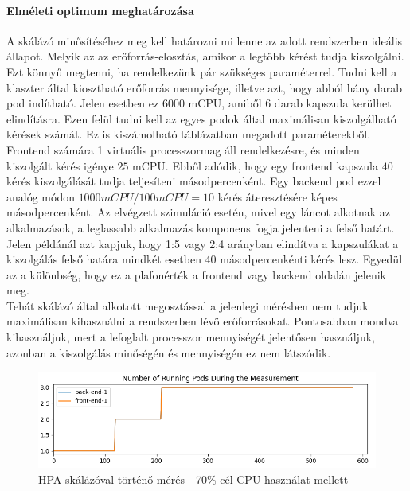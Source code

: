 \paragraph{Elméleti optimum meghatározása} 
A skálázó minősítéséhez meg kell határozni mi lenne az adott rendszerben ideális állapot.
Melyik az az erőforrás-elosztás, amikor a legtöbb kérést tudja kiszolgálni.
Ezt könnyű megtenni, ha rendelkezünk pár szükséges paraméterrel.
Tudni kell a klaszter által kiosztható erőforrás mennyisége, illetve azt, hogy abból hány darab pod indítható. Jelen esetben ez $6000$ mCPU, amiből $6$ darab kapszula kerülhet elindításra.
Ezen felül tudni kell az egyes podok által maximálisan kiszolgálható kérések számát. 
Ez is kiszámolható  táblázatban megadott paraméterekből. 
Frontend számára 1 virtuális processzormag áll rendelkezésre, és minden kiszolgált kérés igénye $25$ mCPU.
Ebből adódik, hogy egy frontend kapszula $40$ kérés kiszolgálását tudja teljesíteni másodpercenként. 
Egy backend pod ezzel analóg módon $1000mCPU / 100mCPU = 10$ kérés áteresztésére képes másodpercenként.
Az elvégzett szimuláció esetén, mivel egy láncot alkotnak az alkalmazások, a leglassabb alkalmazás komponens fogja jelenteni a felső határt.
Jelen példánál azt kapjuk, hogy 1:5 vagy 2:4 arányban elindítva a kapszulákat a kiszolgálás felső határa mindkét esetben $40$ másodpercenkénti kérés lesz.
Egyedül az a különbség, hogy ez a plafonérték a frontend vagy backend oldalán jelenik meg.\\

Tehát skálázó által alkotott megosztással a jelenlegi mérésben nem tudjuk maximálisan kihasználni a rendszerben lévő erőforrásokat.
Pontosabban mondva kihasználjuk, mert a lefoglalt processzor mennyiségét jelentősen használjuk, azonban a kiszolgálás minőségén és mennyiségén ez nem látszódik.

\begin{figure}[!ht]
	\centering
	\includegraphics[width=150mm, keepaspectratio]{figures/HPA-scaling-in-the-same-time.png}
	\caption{HPA skálázóval történő mérés - 70\% cél CPU használat mellett}
	\label{fig:HPA-scaling-same-time}
\end{figure}

